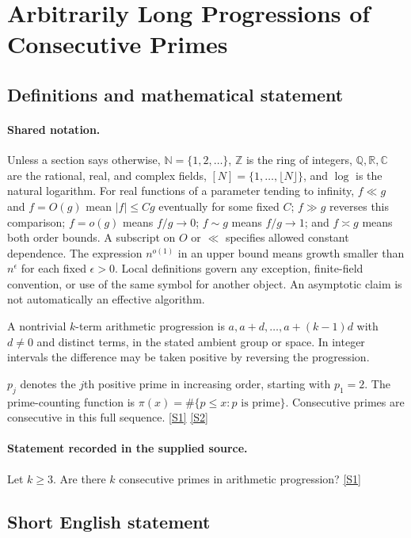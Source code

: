 \documentclass[11pt,a4paper]{article}
\newcommand{\N}{\mathbb{N}}
\newcommand{\Z}{\mathbb{Z}}
\newcommand{\Q}{\mathbb{Q}}
\newcommand{\R}{\mathbb{R}}
\newcommand{\C}{\mathbb{C}}
\newcommand{\sref}[2]{\hyperlink{source:#1:#2}{[S#2]}}
\begin{document}
\section{Arbitrarily Long Progressions of Consecutive Primes}\label{statement}


\subsection{Definitions and mathematical statement}

\paragraph{Shared notation.}Unless a section says otherwise, $\N=\{1,2,\ldots\}$,
$\Z$ is the ring of integers, $\Q,\R,\C$ are the rational, real, and complex
fields, $[N]=\{1,\ldots,\lfloor N\rfloor\}$, and $\log$ is the natural
logarithm. For real functions of a parameter tending to infinity,
$f\ll g$ and $f=O(g)$ mean $|f|\leq Cg$ eventually for some fixed $C$;
$f\gg g$ reverses this comparison; $f=o(g)$ means $f/g\to0$;
$f\sim g$ means $f/g\to1$; and $f\asymp g$ means both order bounds.
A subscript on $O$ or $\ll$ specifies allowed constant dependence.
The expression $n^{o(1)}$ in an upper bound means growth smaller than
$n^\epsilon$ for each fixed $\epsilon>0$. Local definitions govern any
exception, finite-field convention, or use of the same symbol for another
object. An asymptotic claim is not automatically an effective algorithm.



A nontrivial $k$-term arithmetic progression is $a,a+d,\ldots,a+(k-1)d$ with $d\ne0$ and distinct terms, in the stated ambient group or space. In integer intervals the difference may be taken positive by reversing the progression.

$p_j$ denotes the $j$th positive prime in increasing order, starting with $p_1=2$. The prime-counting function is $\pi(x)=\#\{p\leq x:p\text{ is prime}\}$. Consecutive primes are consecutive in this full sequence. \sref{statement}{1} \sref{statement}{2}

\paragraph{Statement recorded in the supplied source.}
Let $k\geq 3$. Are there $k$ consecutive primes in arithmetic progression? \sref{statement}{1}

\subsection{Short English statement}
\end{document}
